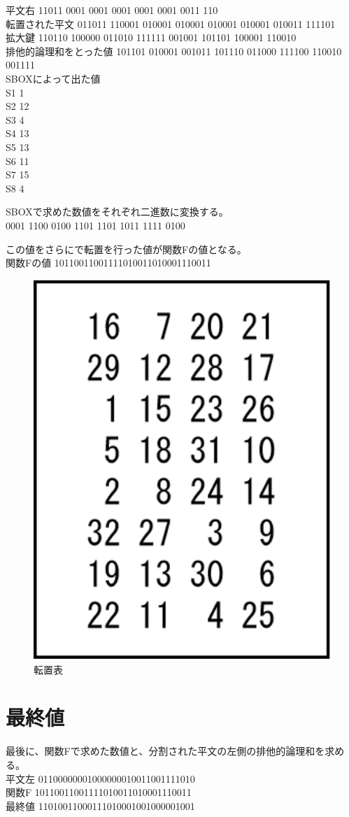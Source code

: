 \documentclass[uplatex]{jsarticle}
\begin{document}
平文右
11011 0001 0001 0001 0001 0001 0011 110\\
転置された平文
011011 110001 010001 010001 010001 010001 010011 111101\\
拡大鍵
110110 100000 011010 111111 001001 101101 100001 110010\\
排他的論理和をとった値
101101 010001 001011 101110 011000 111100 110010 001111\\
SBOXによって出た値\\
S1 1\\
S2 12\\
S3 4\\
S4 13\\
S5 13\\
S6 11\\
S7 15\\
S8 4


SBOXで求めた数値をそれぞれ二進数に変換する。\\
0001 1100 0100 1101 1101 1011 1111 0100


この値をさらにで転置を行った値が関数Fの値となる。\\
関数Fの値
10110011001111010011010001110011

\newpage

\begin{figure}[h]
  \begin{center}
    \includegraphics[width=0.5\linewidth]{tenp.eps}
    \caption{転置表}
    \label{figs6}
  \end{center}
\end{figure}


\section{最終値}
最後に、関数Fで求めた数値と、分割された平文の左側の排他的論理和を求める。\\
平文左
01100000001000000010011001111010\\
関数F
10110011001111010011010001110011\\
最終値
11010011000111010001001000001001\\

\end{document}
